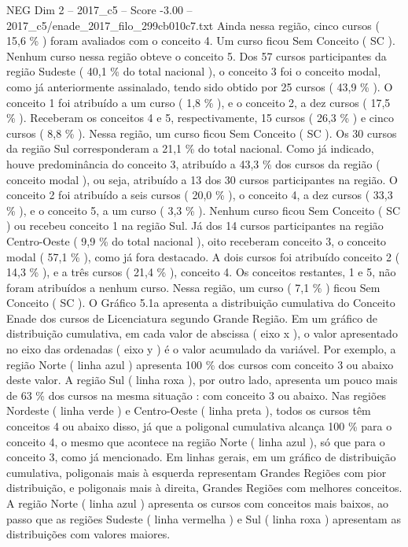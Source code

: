\begin{textsample}{NEG Dim 2 – 2017\_c5 – Score -3.00 – 2017\_c5/enade\_2017\_filo\_299cb010c7.txt}
Ainda nessa região, cinco cursos ( 15,6 \% ) foram avaliados com o conceito 4.
Um curso ficou Sem Conceito ( SC ).
Nenhum curso nessa região obteve o conceito 5.
Dos 57 cursos participantes da região Sudeste ( 40,1 \% do total nacional ), o conceito 3 foi o conceito modal, como já anteriormente assinalado, tendo sido obtido por 25 cursos ( 43,9 \% ).
O conceito 1 foi atribuído a um curso ( 1,8 \% ), e o conceito 2, a dez cursos ( 17,5 \% ).
Receberam os conceitos 4 e 5, respectivamente, 15 cursos ( 26,3 \% ) e cinco cursos ( 8,8 \% ).
Nessa região, um curso ficou Sem Conceito ( SC ).
Os 30 cursos da região Sul corresponderam a 21,1 \% do total nacional.
Como já indicado, houve predominância do conceito 3, atribuído a 43,3 \% dos cursos da região ( conceito modal ), ou seja, atribuído a 13 dos 30 cursos participantes na região.
O conceito 2 foi atribuído a seis cursos ( 20,0 \% ), o conceito 4, a dez cursos ( 33,3 \% ), e o conceito 5, a um curso ( 3,3 \% ).
Nenhum curso ficou Sem Conceito ( SC ) ou recebeu conceito 1 na região Sul.
Já dos 14 cursos participantes na região Centro-Oeste ( 9,9 \% do total nacional ), oito receberam conceito 3, o conceito modal ( 57,1 \% ), como já fora destacado.
A dois cursos foi atribuído conceito 2 ( 14,3 \% ), e a três cursos ( 21,4 \% ), conceito 4.
Os conceitos restantes, 1 e 5, não foram atribuídos a nenhum curso.
Nessa região, um curso ( 7,1 \% ) ficou Sem Conceito ( SC ).
O Gráfico 5.1a apresenta a distribuição cumulativa do Conceito Enade dos cursos de Licenciatura segundo Grande Região.
Em um gráfico de distribuição cumulativa, em cada valor de abscissa ( eixo x ), o valor apresentado no eixo das ordenadas ( eixo y ) é o valor acumulado da variável.
Por exemplo, a região Norte ( linha azul ) apresenta 100 \% dos cursos com conceito 3 ou abaixo deste valor.
A região Sul ( linha roxa ), por outro lado, apresenta um pouco mais de 63 \% dos cursos na mesma situação : com conceito 3 ou abaixo.
Nas regiões Nordeste ( linha verde ) e Centro-Oeste ( linha preta ), todos os cursos têm conceitos 4 ou abaixo disso, já que a poligonal cumulativa alcança 100 \% para o conceito 4, o mesmo que acontece na região Norte ( linha azul ), só que para o conceito 3, como já mencionado.
Em linhas gerais, em um gráfico de distribuição cumulativa, poligonais mais à esquerda representam Grandes Regiões com pior distribuição, e poligonais mais à direita, Grandes Regiões com melhores conceitos.
A região Norte ( linha azul ) apresenta os cursos com conceitos mais baixos, ao passo que as regiões Sudeste ( linha vermelha ) e Sul ( linha roxa ) apresentam as distribuições com valores maiores.

\end{textsample}
